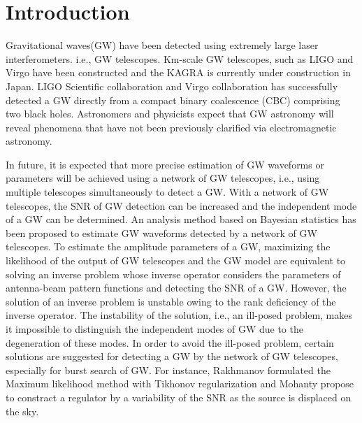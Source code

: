 \documentclass[%
 aps,
 prd,
 amsmath,amssymb,
 reprint,%
superscriptaddress
]{revtex4-1}
\begin{document}
\maketitle

\section{\label{sec:intro}Introduction}
Gravitational waves(GW) have been detected using extremely large laser interferometers. i.e., GW telescopes. Km-scale GW telescopes, such as LIGO\cite{0034-4885-72-7-076901} and Virgo\cite{0264-9381-32-2-024001} have been constructed and the KAGRA\cite{PhysRevD.88.043007} is currently under construction in Japan. LIGO Scientific collaboration and Virgo collaboration has successfully detected a GW directly from a compact binary coalescence (CBC) comprising two black holes\cite{PhysRevLett.116.061102}. Astronomers and physicists expect that GW astronomy will reveal phenomena that have not been previously clarified via electromagnetic astronomy.

In future, it is expected that more precise estimation of GW waveforms or parameters will be achieved using a network of GW telescopes\cite{PhysRevD.88.062001}, i.e., using multiple telescopes simultaneously to detect a GW. With a network of GW telescopes, the SNR of GW detection can be increased and the independent mode of a GW can be determined. An analysis method based on Bayesian statistics has been proposed\cite{PhysRevD.83.084002} to estimate GW waveforms detected by a network of GW telescopes. To estimate the amplitude parameters of a GW, maximizing the likelihood of the output of GW telescopes and the GW model are equivalent to solving an inverse problem whose inverse operator considers the parameters of antenna-beam pattern functions and detecting the SNR of a GW\cite{PhysRevD.83.084002}. However, the solution of an inverse problem is unstable owing to the rank deficiency of the inverse operator. The instability of the solution, i.e., an ill-posed problem, makes it impossible to distinguish the independent modes of GW due to the degeneration of these modes. In order to avoid the ill-posed problem, certain solutions are suggested for detecting a GW by the network of GW telescopes, especially for burst search of GW. For instance, Rakhmanov formulated the Maximum likelihood method with Tikhonov regularization\cite{0264-9381-23-19-S05} and Mohanty propose to constract a regulator by a variability of the SNR as the source is displaced on the sky\cite{0264-9381-23-15-001}.
\end{document}
